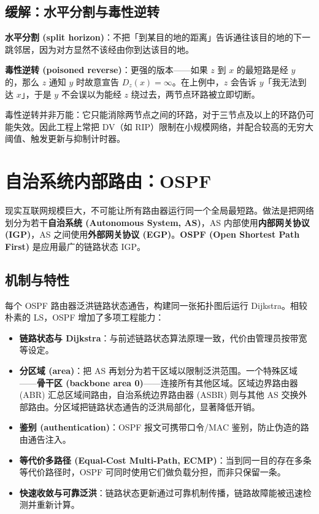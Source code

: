 \subsection{缓解：水平分割与毒性逆转}

\textbf{水平分割 (split horizon)}：不把「到某目的地的距离」告诉通往该目的地的下一跳邻居，因为对方显然不该经由你到达该目的地。

\textbf{毒性逆转 (poisoned reverse)}：更强的版本——如果 $z$ 到 $x$ 的最短路是经 $y$ 的，那么 $z$ 通知 $y$ 时故意宣告 $D_z(x)=\infty$。在上例中，$z$ 会告诉 $y$「我无法到达 $x$」，于是 $y$ 不会误以为能经 $z$ 绕过去，两节点环路被立即切断。

毒性逆转并非万能：它只能消除两节点之间的环路，对于三节点及以上的环路仍可能失效。因此工程上常把 DV（如 RIP）限制在小规模网络，并配合较高的无穷大阈值、触发更新与抑制计时器。

\section{自治系统内部路由：OSPF}

现实互联网规模巨大，不可能让所有路由器运行同一个全局最短路。做法是把网络划分为若干\textbf{自治系统 (Autonomous System, AS)}，AS 内部使用\textbf{内部网关协议 (IGP)}，AS 之间使用\textbf{外部网关协议 (EGP)}。\textbf{OSPF (Open Shortest Path First)} 是应用最广的链路状态 IGP。

\subsection{机制与特性}

每个 OSPF 路由器泛洪链路状态通告，构建同一张拓扑图后运行 Dijkstra。相较朴素的 LS，OSPF 增加了多项工程能力：

\begin{itemize}
    \item \textbf{链路状态与 Dijkstra}：与前述链路状态算法原理一致，代价由管理员按带宽等设定。
    \item \textbf{分区域 (area)}：把 AS 再划分为若干区域以限制泛洪范围。一个特殊区域——\textbf{骨干区 (backbone area 0)}——连接所有其他区域。区域边界路由器 (ABR) 汇总区域间路由，自治系统边界路由器 (ASBR) 则与其他 AS 交换外部路由。分区域把链路状态通告的泛洪局部化，显著降低开销。
    \item \textbf{鉴别 (authentication)}：OSPF 报文可携带口令/MAC 鉴别，防止伪造的路由通告注入。
    \item \textbf{等代价多路径 (Equal-Cost Multi-Path, ECMP)}：当到同一目的存在多条等代价路径时，OSPF 可同时使用它们做负载分担，而非只保留一条。
    \item \textbf{快速收敛与可靠泛洪}：链路状态更新通过可靠机制传播，链路故障能被迅速检测并重新计算。
\end{itemize}


